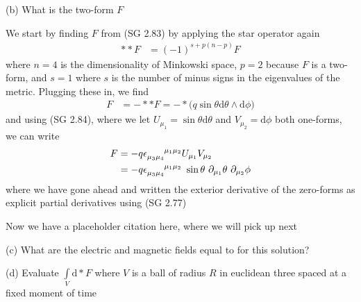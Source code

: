 (b) What is the two-form $F$ 

We start by finding $F$ from (SG 2.83) by applying the star operator again
%
\begin{align}
\ast \ast F &= (-1)^{s + p\left(n-p\right)} F
\end{align} 
%
where $n = 4$ is the dimensionality of Minkowski space, $p=2$ because $F$ is a two-form, and $s=1$ where $s$ is the number of minus signs in the eigenvalues of the metric. Plugging these in, we find  
%
\begin{align}
F &= - \ast \ast F = - \ast \big( q \sin{\theta}  \textrm{d} \theta  \wedge  \textrm{d} \phi \big)
\end{align} 
%
and using (SG 2.84), where we let $U_{\mu_1} = \sin{\theta}  \textrm{d} \theta$ and $V_{\mu_2} =  \textrm{d} \phi$ both one-forms, we can write 
%
\begin{align}
F &= - q \epsilon\indices{_{\mu_3 \mu_4}^{\mu_1 \mu_2}} U_{\mu_1} V_{\mu_2} \\
&= - q \epsilon\indices{_{\mu_3 \mu_4}^{\mu_1 \mu_2}} \ \sin{\theta} \ \partial_{\mu_1} \theta \ \partial_{\mu_2} \phi
\end{align} 
%
where we have gone ahead and written the exterior derivative of the zero-forms as explicit partial derivatives using (SG 2.77) 

Now we have a placeholder citation here, where we will pick up next \cite{Wiki:1}


(c) What are the electric and magnetic fields equal to for this solution? 

(d) Evaluate $ \int\limits_{V} \textrm{d} \ast F $ where $V$ is a ball of radius $R$ in euclidean three spaced at a fixed moment of time